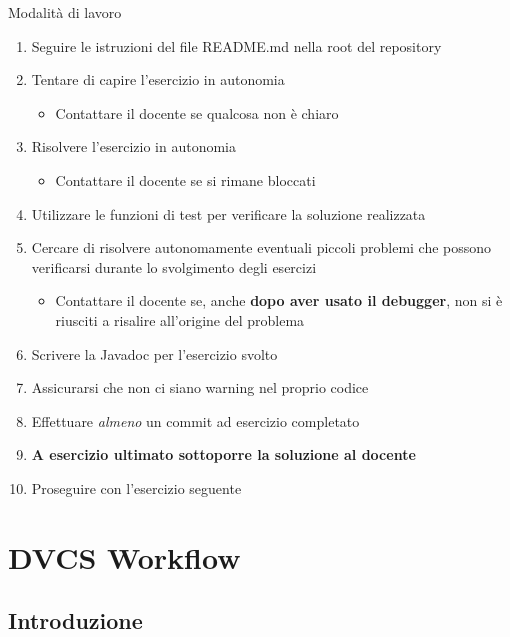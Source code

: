 \documentclass[presentation]{beamer}
\begin{document}
\begin{frame}{Modalità di lavoro}
	\begin{enumerate}
		\item Seguire le istruzioni del file README.md nella root del repository
		\item Tentare di capire l'esercizio in autonomia
		\begin{itemize}
			\item Contattare il docente se qualcosa non è chiaro
		\end{itemize}
		\item Risolvere l'esercizio in autonomia
		\begin{itemize}
			\item Contattare il docente se si rimane bloccati
		\end{itemize}
		\item Utilizzare le funzioni di test per verificare la soluzione realizzata
		\item Cercare di risolvere autonomamente eventuali piccoli problemi che possono verificarsi durante lo svolgimento degli esercizi
		\begin{itemize}
			\item Contattare il docente se, anche \textbf{dopo aver usato il debugger}, non si è riusciti a risalire all'origine del problema
		\end{itemize}
		\item Scrivere la Javadoc per l'esercizio svolto
		\item Assicurarsi che non ci siano warning nel proprio codice
		\item Effettuare \textit{almeno} un commit ad esercizio completato
		\item \textbf{A esercizio ultimato sottoporre la soluzione al docente}
		\item Proseguire con l'esercizio seguente
	\end{enumerate}
\end{frame}


\section{DVCS Workflow}

\subsection{Introduzione}
\end{document}
